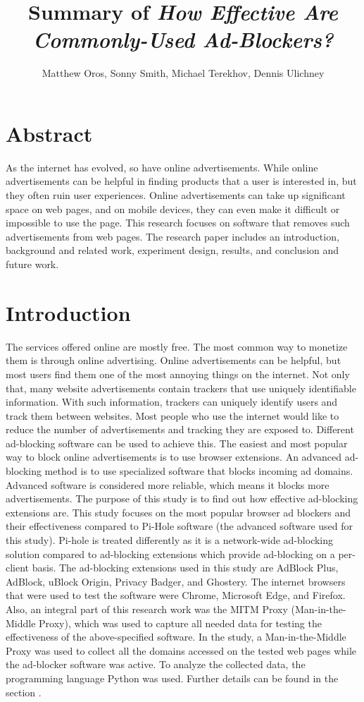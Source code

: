 \documentclass[sigsmall]{acmart}
\title{Summary of \emph{How Effective Are Commonly-Used Ad-Blockers?}}
\author{Matthew Oros, Sonny Smith, Michael Terekhov, Dennis Ulichney}
\begin{document}
\maketitle


\section*{Abstract}
As the internet has evolved, so have online advertisements. While online advertisements can be helpful in finding products that a user is interested in, but they often ruin user experiences. Online advertisements can take up significant space on web pages, and on mobile devices, they can even make it difficult or impossible to use the page. This research focuses on software that removes such advertisements from web pages. The research paper includes an introduction, background and related work, experiment design, results, and conclusion and future work.  

\section*{Introduction}
The services offered online are mostly free. The most common way to monetize them is through online advertising. Online advertisements can be helpful, but most users find them one of the most annoying things on the internet. Not only that, many website advertisements contain trackers that use uniquely identifiable information. With such information, trackers can uniquely identify users and track them between websites. Most people who use the internet would like to reduce the number of advertisements and tracking they are exposed to. Different ad-blocking software can be used to achieve this. The easiest and most popular way to block online advertisements is to use browser extensions. An advanced ad-blocking method is to use specialized software that blocks incoming ad domains. Advanced software is considered more reliable, which means it blocks more advertisements. The purpose of this study is to find out how effective ad-blocking extensions are. This study focuses on the most popular browser ad blockers and their effectiveness compared to Pi-Hole software (the advanced software used for this study). Pi-hole is treated differently as it is a network-wide ad-blocking solution compared to ad-blocking extensions which provide ad-blocking on a per-client basis. The ad-blocking extensions used in this study are AdBlock Plus, AdBlock, uBlock Origin, Privacy Badger, and Ghostery. The internet browsers that were used to test the software were Chrome, Microsoft Edge, and Firefox. Also, an integral part of this research work was the MITM Proxy (Man-in-the-Middle Proxy), which was used to capture all needed data for testing the effectiveness of the above-specified software. In the study, a Man-in-the-Middle Proxy was used to collect all the domains accessed on the tested web pages while the ad-blocker software was active. To analyze the collected data, the programming language Python was used. Further details can be found in the section . 
\end{document}
